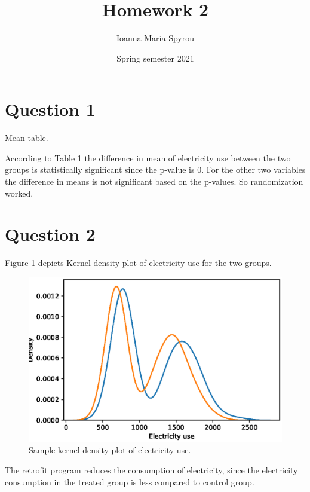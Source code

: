 \documentclass{article}
\title{Homework 2}
\author{Ioanna Maria Spyrou}
\date{Spring semester 2021}
\begin{document}
  
\maketitle


\section{Question 1}

\begin{table}[h]
    \centering
    
    \caption{Mean table.}
    \label{tab:my_label}
\end{table}

According to Table 1 the difference in mean of electricity use between the two groups is statistically significant since the p-value is 0. For the other two variables the difference in means is not significant based on the p-values. So randomization worked.

\section{Question 2}
Figure 1 depicts Kernel density plot of electricity use for the two groups.

\begin{figure}[ht]
    \centering
    \includegraphics[scale = 0.7]{plot.eps}
    \caption{Sample kernel density plot of electricity use.}
    \label{fig:plot}
\end{figure}

The retrofit program reduces the consumption of electricity, since the electricity consumption in the treated group is less compared to control group.
\end{document}
